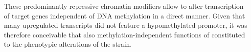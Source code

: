 These predominantly repressive chromatin modifiers allow  to alter transcription of target genes independent of DNA methylation in a direct manner\cite{Espada2011,Clements2012}.  Given that many upregulated transcripts did not feature a hypomethylated promoter, it was therefore conceivable that also methylation-independent functions of   constituted to the phenotypic alterations of the \dnmtchip strain.    